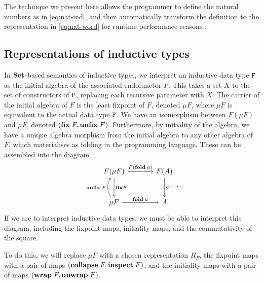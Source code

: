 The technique we present here allows the programmer to define the natural
numbers as in \eqref{eq:nat-ind}, and then automatically transform the
definition to the representation in \eqref{eq:nat-word} for runtime performance
reasons .

\subsection{Representations of inductive types}
In $\mathbf{Set}$-based semantics of inductive types, we interpret an inductive data
type $\texttt{F}$ as the initial algebra of the associated endofunctor $F$. This
takes a set $X$ to the set of constructors of $\texttt{F}$, replacing each
recursive parameter with $X$. The carrier of the initial algebra of $F$ is the
least fixpoint of $F$, denoted $\mu F$, where $\mu F$ is equivalent to the
actual data type $\texttt{F}$. We have an isomorphism between $F(\mu F)$ and
$\mu F$, denoted $(\textbf{fix}\;F, \textbf{unfix}\;F)$. Furthermore, by initiality
of the algebra, we have a unique algebra morphism from the initial algebra to
any other algebra of $F$, which materialises as folding in the programming
language. These can be assembled into the diagram
\begin{equation*}
  \begin{tikzcd}[column sep=large, row sep=large]
    F(\mu F) \ar[r, "F(\mta{fold}\;a)"] \ar[d, "\mta{fix} F"] & F(A) \ar[d, "a"] \\
    \mu F \ar[u, bend left, "\mta{unfix}\;F"] \ar[r, "\mta{fold}\;a"] & A
  \end{tikzcd} \,.
\end{equation*}
If we are to interpret inductive data types, we must be able to interpret
this diagram, including the fixpoint maps, initiality maps, and the commutativity
of the square. 

To do this, we will replace $\mu F$ with a chosen representation $R_F$, the
fixpoint maps with a pair of maps $(\textbf{collapse}\;F, \textbf{inspect}\;F)$, and
the initiality maps with a pair of maps $(\textbf{wrap}\;F, \textbf{unwrap}\;F)$.

